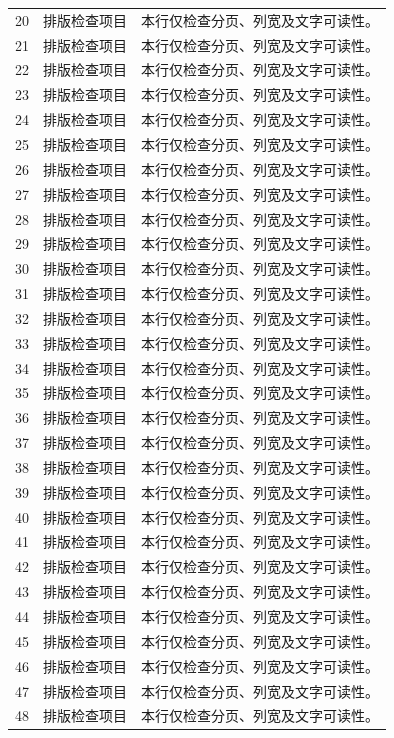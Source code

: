 \begin{longtable}{@{}p{.10\linewidth}p{.30\linewidth}p{.53\linewidth}@{}}
20 & 排版检查项目 & 本行仅检查分页、列宽及文字可读性。\\
21 & 排版检查项目 & 本行仅检查分页、列宽及文字可读性。\\
22 & 排版检查项目 & 本行仅检查分页、列宽及文字可读性。\\
23 & 排版检查项目 & 本行仅检查分页、列宽及文字可读性。\\
24 & 排版检查项目 & 本行仅检查分页、列宽及文字可读性。\\
25 & 排版检查项目 & 本行仅检查分页、列宽及文字可读性。\\
26 & 排版检查项目 & 本行仅检查分页、列宽及文字可读性。\\
27 & 排版检查项目 & 本行仅检查分页、列宽及文字可读性。\\
28 & 排版检查项目 & 本行仅检查分页、列宽及文字可读性。\\
29 & 排版检查项目 & 本行仅检查分页、列宽及文字可读性。\\
30 & 排版检查项目 & 本行仅检查分页、列宽及文字可读性。\\
31 & 排版检查项目 & 本行仅检查分页、列宽及文字可读性。\\
32 & 排版检查项目 & 本行仅检查分页、列宽及文字可读性。\\
33 & 排版检查项目 & 本行仅检查分页、列宽及文字可读性。\\
34 & 排版检查项目 & 本行仅检查分页、列宽及文字可读性。\\
35 & 排版检查项目 & 本行仅检查分页、列宽及文字可读性。\\
36 & 排版检查项目 & 本行仅检查分页、列宽及文字可读性。\\
37 & 排版检查项目 & 本行仅检查分页、列宽及文字可读性。\\
38 & 排版检查项目 & 本行仅检查分页、列宽及文字可读性。\\
39 & 排版检查项目 & 本行仅检查分页、列宽及文字可读性。\\
40 & 排版检查项目 & 本行仅检查分页、列宽及文字可读性。\\
41 & 排版检查项目 & 本行仅检查分页、列宽及文字可读性。\\
42 & 排版检查项目 & 本行仅检查分页、列宽及文字可读性。\\
43 & 排版检查项目 & 本行仅检查分页、列宽及文字可读性。\\
44 & 排版检查项目 & 本行仅检查分页、列宽及文字可读性。\\
45 & 排版检查项目 & 本行仅检查分页、列宽及文字可读性。\\
46 & 排版检查项目 & 本行仅检查分页、列宽及文字可读性。\\
47 & 排版检查项目 & 本行仅检查分页、列宽及文字可读性。\\
48 & 排版检查项目 & 本行仅检查分页、列宽及文字可读性。\\
\end{longtable}
